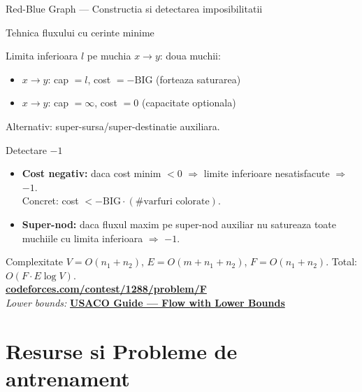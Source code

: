 ﻿\documentclass[9pt]{beamer}
\begin{document}
\begin{frame}{Red-Blue Graph --- Constructia si detectarea imposibilitatii}
  \begin{block}{Tehnica fluxului cu cerinte minime}
    \begin{scriptsize}
    Limita inferioara $l$ pe muchia $x\to y$: doua muchii:
    \begin{itemize}\itemsep0pt
      \item $x\to y$: cap $=l$, cost $=-\mathrm{BIG}$ (forteaza saturarea)
      \item $x\to y$: cap $=\infty$, cost $=0$ (capacitate optionala)
    \end{itemize}
    Alternativ: super-sursa/super-destinatie auxiliara.
    \end{scriptsize}
  \end{block}
  \vspace{-6pt}
  \begin{alertblock}{Detectare $-1$}
    \begin{scriptsize}
    \begin{itemize}\itemsep0pt
      \item \textbf{Cost negativ:} daca cost minim $< 0$ $\Rightarrow$ limite inferioare nesatisfacute $\Rightarrow$ $-1$.\\
            Concret: cost $< -\mathrm{BIG}\cdot(\#\text{varfuri colorate})$.
      \item \textbf{Super-nod:} daca fluxul maxim pe super-nod auxiliar nu satureaza
            toate muchiile cu limita inferioara $\Rightarrow$ $-1$.
    \end{itemize}
    \end{scriptsize}
  \end{alertblock}
  \vspace{-6pt}
  \begin{block}{Complexitate}
    \footnotesize
    $V=O(n_1{+}n_2)$, $E=O(m{+}n_1{+}n_2)$, $F=O(n_1{+}n_2)$. Total: $O(F\!\cdot\! E\log V)$.\\
    \href{https://codeforces.com/contest/1288/problem/F}{\textbf{codeforces.com/contest/1288/problem/F}}\\
    \textit{Lower bounds:} \href{https://usaco.guide/adv/flow-lb?lang=cpp}{\textbf{USACO Guide --- Flow with Lower Bounds}}
  \end{block}
\end{frame}

\section*{Resurse si Probleme de antrenament}
\end{document}
